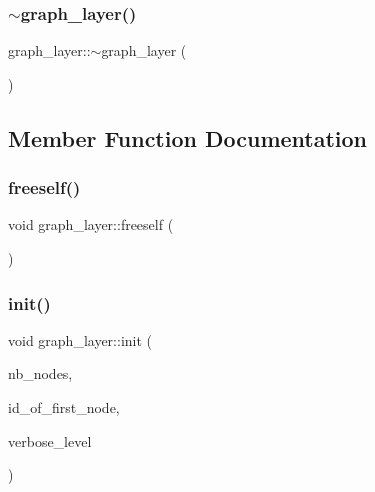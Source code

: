 \mbox{\label{classgraph__layer_a046e1ac94b52119b3a17abec31d316d6}} 
\subsubsection{\texorpdfstring{$\sim$graph\+\_\+layer()}{~graph\_layer()}}
{\footnotesize\ttfamily graph\+\_\+layer\+::$\sim$graph\+\_\+layer (\begin{DoxyParamCaption}{ }\end{DoxyParamCaption})}



\subsection{Member Function Documentation}
\mbox{\label{classgraph__layer_af6d280f56bdec46e2650648fd597a127}} 
\subsubsection{\texorpdfstring{freeself()}{freeself()}}
{\footnotesize\ttfamily void graph\+\_\+layer\+::freeself (\begin{DoxyParamCaption}{ }\end{DoxyParamCaption})}

\mbox{\label{classgraph__layer_a4b3e02d2069fb0127514a3d9ce000ff0}} 
\subsubsection{\texorpdfstring{init()}{init()}}
{\footnotesize\ttfamily void graph\+\_\+layer\+::init (\begin{DoxyParamCaption}\item[{\mbox{\hyperlink{galois_8h_a09fddde158a3a20bd2dcadb609de11dc}{I\+NT}}}]{nb\+\_\+nodes,  }\item[{\mbox{\hyperlink{galois_8h_a09fddde158a3a20bd2dcadb609de11dc}{I\+NT}}}]{id\+\_\+of\+\_\+first\+\_\+node,  }\item[{\mbox{\hyperlink{galois_8h_a09fddde158a3a20bd2dcadb609de11dc}{I\+NT}}}]{verbose\+\_\+level }\end{DoxyParamCaption})}

